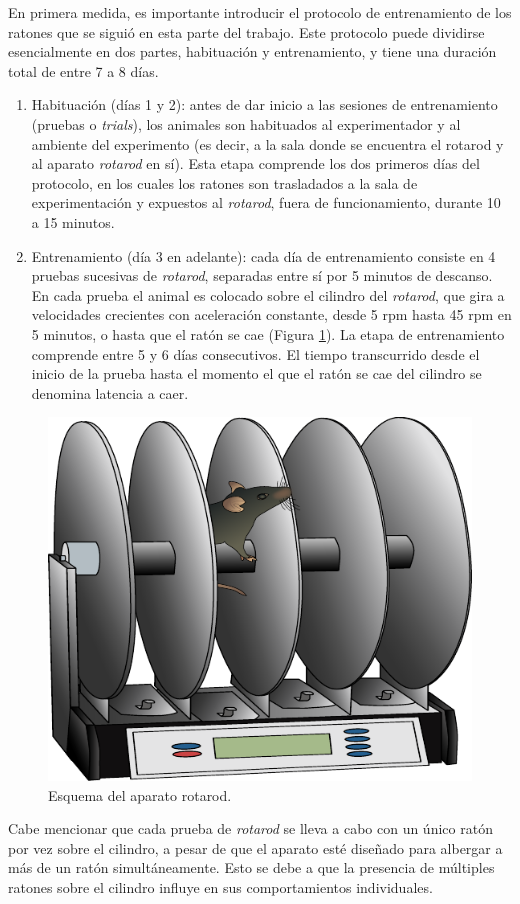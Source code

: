 En primera medida, es importante introducir el protocolo de entrenamiento de los ratones que se siguió en esta parte del trabajo. Este protocolo puede dividirse esencialmente en dos partes, habituación y entrenamiento, y tiene una duración total de entre 7 a 8 días.
\begin{enumerate}
\item Habituación (días 1 y 2): antes de dar inicio a las sesiones de entrenamiento (pruebas o \textit{trials}), los animales son habituados al experimentador y al ambiente del experimento (es decir, a la sala donde se encuentra el rotarod y al aparato \textit{rotarod} en sí). Esta etapa comprende los dos primeros días del protocolo, en los cuales los ratones son trasladados a la sala de experimentación y expuestos al \textit{rotarod}, fuera de funcionamiento, durante 10 a 15 minutos.

\item Entrenamiento (día 3 en adelante): cada día de entrenamiento consiste en 4 pruebas sucesivas de \textit{rotarod}, separadas entre sí por 5 minutos de descanso. En cada prueba el animal es colocado sobre el cilindro del \textit{rotarod}, que gira a velocidades crecientes con aceleración constante, desde 5 rpm hasta 45 rpm en 5 minutos, o hasta que el ratón se cae (Figura \ref{fig:rotarod}). La etapa de entrenamiento comprende entre 5 y 6 días consecutivos. El tiempo transcurrido desde el inicio de la prueba hasta el momento el que el ratón se cae del cilindro se denomina latencia a caer.
\end{enumerate}

\begin{figure}[!htbp]
    \centering
    \includegraphics[width=0.5\linewidth]{figuras/expertos/experimento/rotarod.pdf}
    \caption{ Esquema del aparato rotarod.}
    \label{fig:rotarod}
\end{figure}

Cabe mencionar que cada prueba de \textit{rotarod} se lleva a cabo con un único ratón por vez sobre el cilindro, a pesar de que el aparato esté diseñado para albergar a más de un ratón simultáneamente. Esto se debe a que la presencia de múltiples ratones sobre el cilindro influye en sus comportamientos individuales.

